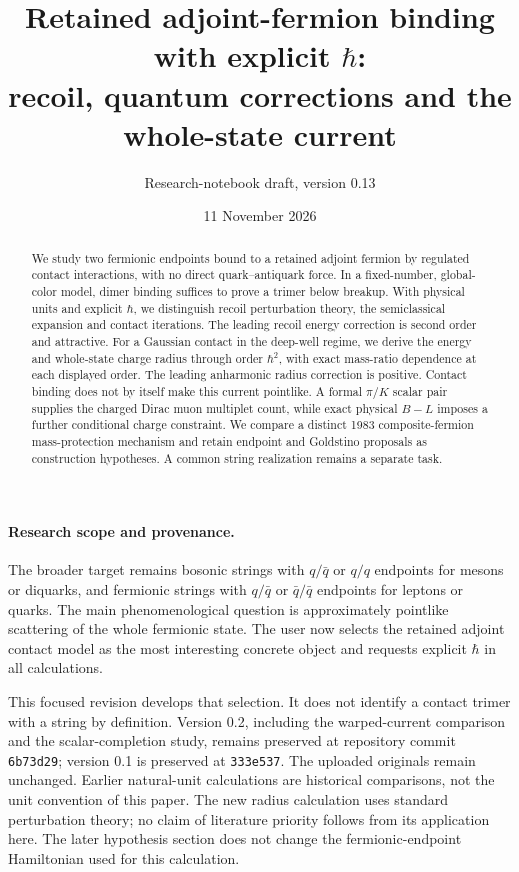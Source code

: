 \documentclass[11pt]{article}
\title{Retained adjoint-fermion binding with explicit $\hbar$:\\
recoil, quantum corrections and the whole-state current}
\author{Research-notebook draft, version 0.13}
\date{11 November 2026}
\begin{document}
\maketitle
\begin{abstract}
We study two fermionic endpoints bound to a retained adjoint fermion by regulated contact interactions, with no direct quark--antiquark force. In a fixed-number, global-color model, dimer binding suffices to prove a trimer below breakup. With physical units and explicit $\hbar$, we distinguish recoil perturbation theory, the semiclassical expansion and contact iterations. The leading recoil energy correction is second order and attractive. For a Gaussian contact in the deep-well regime, we derive the energy and whole-state charge radius through order $\hbar^2$, with exact mass-ratio dependence at each displayed order. The leading anharmonic radius correction is positive. Contact binding does not by itself make this current pointlike. A formal $\pi/K$ scalar pair supplies the charged Dirac muon multiplet count, while exact physical $B-L$ imposes a further conditional charge constraint. We compare a distinct 1983 composite-fermion mass-protection mechanism and retain endpoint and Goldstino proposals as construction hypotheses. A common string realization remains a separate task.
\end{abstract}

\paragraph{Research scope and provenance.}
The broader target remains bosonic strings with $q/\bar q$ or $q/q$ endpoints for mesons or diquarks, and fermionic strings with $q/\bar q$ or $\bar q/\bar q$ endpoints for leptons or quarks. The main phenomenological question is approximately pointlike scattering of the whole fermionic state. The user now selects the retained adjoint contact model as the most interesting concrete object and requests explicit $\hbar$ in all calculations.

This focused revision develops that selection. It does not identify a contact trimer with a string by definition. Version 0.2, including the warped-current comparison and the scalar-completion study, remains preserved at repository commit \texttt{6b73d29}; version 0.1 is preserved at \texttt{333e537}. The uploaded originals remain unchanged. Earlier natural-unit calculations are historical comparisons, not the unit convention of this paper. The new radius calculation uses standard perturbation theory; no claim of literature priority follows from its application here. The later hypothesis section does not change the fermionic-endpoint Hamiltonian used for this calculation.
\end{document}
